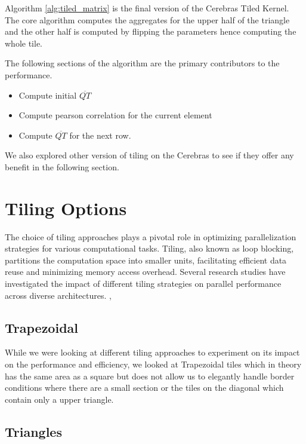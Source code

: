 Algorithm \ref{alg:tiled_matrix} is the final version of the Cerebras Tiled Kernel. The core algorithm computes the aggregates for the upper half of the triangle and the other half is computed by flipping the parameters hence computing the whole tile.

The following sections of the algorithm are the primary contributors to the performance.

\begin{itemize}
    \item Compute initial $\overline{QT}$
    \item Compute pearson correlation for the current element
    \item Compute $\overline{QT}$ for the next row.
\end{itemize}

We also explored other version of tiling on the Cerebras to see if they offer any benefit in the following section.
\clearpage

\section{Tiling Options} \label{section:tiling}

The choice of tiling approaches plays a pivotal role in optimizing parallelization strategies for various computational tasks. Tiling, also known as loop blocking, partitions the computation space into smaller units, facilitating efficient data reuse and minimizing memory access overhead.
Several research studies have investigated the impact of different tiling strategies on parallel performance across diverse architectures. \cite{10}, \cite{11}

\subsection{Trapezoidal} \label{subsection:trapezoidal}

While we were looking at different tiling approaches to experiment on its impact on the performance and efficiency, we looked at Trapezoidal tiles which in theory has the same area as a square but does not allow us to elegantly handle border conditions where there are a small section or the tiles on the diagonal which contain only a upper triangle.  

\subsection{Triangles} \label{subsection:triangle}

